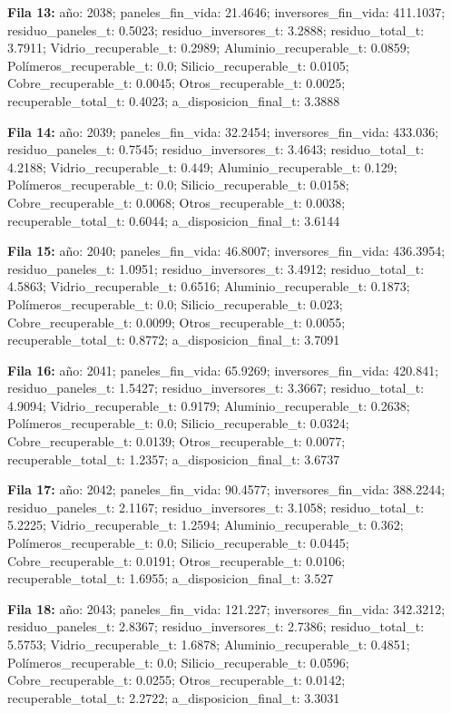 {\footnotesize\textbf{Fila 13:} año: 2038; paneles\_fin\_vida: 21.4646; inversores\_fin\_vida: 411.1037; residuo\_paneles\_t: 0.5023; residuo\_inversores\_t: 3.2888; residuo\_total\_t: 3.7911; Vidrio\_recuperable\_t: 0.2989; Aluminio\_recuperable\_t: 0.0859; Polímeros\_recuperable\_t: 0.0; Silicio\_recuperable\_t: 0.0105; Cobre\_recuperable\_t: 0.0045; Otros\_recuperable\_t: 0.0025; recuperable\_total\_t: 0.4023; a\_disposicion\_final\_t: 3.3888\par}
{\footnotesize\textbf{Fila 14:} año: 2039; paneles\_fin\_vida: 32.2454; inversores\_fin\_vida: 433.036; residuo\_paneles\_t: 0.7545; residuo\_inversores\_t: 3.4643; residuo\_total\_t: 4.2188; Vidrio\_recuperable\_t: 0.449; Aluminio\_recuperable\_t: 0.129; Polímeros\_recuperable\_t: 0.0; Silicio\_recuperable\_t: 0.0158; Cobre\_recuperable\_t: 0.0068; Otros\_recuperable\_t: 0.0038; recuperable\_total\_t: 0.6044; a\_disposicion\_final\_t: 3.6144\par}
{\footnotesize\textbf{Fila 15:} año: 2040; paneles\_fin\_vida: 46.8007; inversores\_fin\_vida: 436.3954; residuo\_paneles\_t: 1.0951; residuo\_inversores\_t: 3.4912; residuo\_total\_t: 4.5863; Vidrio\_recuperable\_t: 0.6516; Aluminio\_recuperable\_t: 0.1873; Polímeros\_recuperable\_t: 0.0; Silicio\_recuperable\_t: 0.023; Cobre\_recuperable\_t: 0.0099; Otros\_recuperable\_t: 0.0055; recuperable\_total\_t: 0.8772; a\_disposicion\_final\_t: 3.7091\par}
{\footnotesize\textbf{Fila 16:} año: 2041; paneles\_fin\_vida: 65.9269; inversores\_fin\_vida: 420.841; residuo\_paneles\_t: 1.5427; residuo\_inversores\_t: 3.3667; residuo\_total\_t: 4.9094; Vidrio\_recuperable\_t: 0.9179; Aluminio\_recuperable\_t: 0.2638; Polímeros\_recuperable\_t: 0.0; Silicio\_recuperable\_t: 0.0324; Cobre\_recuperable\_t: 0.0139; Otros\_recuperable\_t: 0.0077; recuperable\_total\_t: 1.2357; a\_disposicion\_final\_t: 3.6737\par}
{\footnotesize\textbf{Fila 17:} año: 2042; paneles\_fin\_vida: 90.4577; inversores\_fin\_vida: 388.2244; residuo\_paneles\_t: 2.1167; residuo\_inversores\_t: 3.1058; residuo\_total\_t: 5.2225; Vidrio\_recuperable\_t: 1.2594; Aluminio\_recuperable\_t: 0.362; Polímeros\_recuperable\_t: 0.0; Silicio\_recuperable\_t: 0.0445; Cobre\_recuperable\_t: 0.0191; Otros\_recuperable\_t: 0.0106; recuperable\_total\_t: 1.6955; a\_disposicion\_final\_t: 3.527\par}
{\footnotesize\textbf{Fila 18:} año: 2043; paneles\_fin\_vida: 121.227; inversores\_fin\_vida: 342.3212; residuo\_paneles\_t: 2.8367; residuo\_inversores\_t: 2.7386; residuo\_total\_t: 5.5753; Vidrio\_recuperable\_t: 1.6878; Aluminio\_recuperable\_t: 0.4851; Polímeros\_recuperable\_t: 0.0; Silicio\_recuperable\_t: 0.0596; Cobre\_recuperable\_t: 0.0255; Otros\_recuperable\_t: 0.0142; recuperable\_total\_t: 2.2722; a\_disposicion\_final\_t: 3.3031\par}
